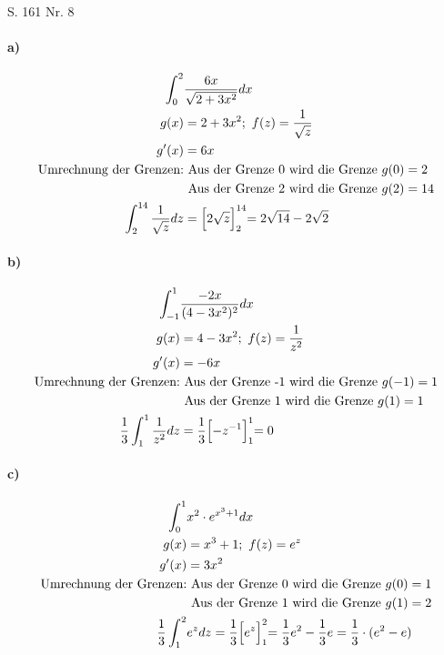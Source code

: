 \documentclass[12pt,a4paper]{report}
\begin{document}
	\noindent
	\Large S. 161 Nr. 8
	\large
	\paragraph{a)}
	\begin{align*}
		\int_{0}^{2} &\frac{6x}{\sqrt{2 + 3x^2}}dx \\
		g(x) &= 2 + 3x^2;\ f(z) = \frac{1}{\sqrt{z}} \\
		g'(x) &= 6x \\
		\text{Umrechnung der Grenzen:}&\ \text{Aus der Grenze 0 wird die Grenze}\  g(0) = 2 \\
		&\ \text{Aus der Grenze 2 wird die Grenze}\ g(2) = 14 \\
		\int_{2}^{14} \frac{1}{\sqrt{z}} dz &= \Bigl[2\sqrt{z}\Bigl]_{2}^{14} = 2\sqrt{14} - 2\sqrt{2}
	\end{align*}
	\paragraph{b)}
	\begin{align*}
		\int_{-1}^{1} &\frac{-2x}{(4-3x^2)^2} dx \\
		g(x) &= 4-3x^2;\ f(z) = \frac{1}{z^2} \\
		g'(x) &= -6x \\
		\text{Umrechnung der Grenzen:}&\ \text{Aus der Grenze -1 wird die Grenze}\ g(-1) = 1 \\
		&\ \text{Aus der Grenze 1 wird die Grenze}\ g(1) = 1 \\
		\frac{1}{3} \int_{1}^{1} \frac{1}{z^2} dz &= \frac{1}{3}\Bigl[-z^{-1}\Bigl]_{1}^{1} = 0
	\end{align*}
	\paragraph{c)}
	\begin{align*}
		\int_{0}^{1} &x^2\cdot e^{x^3+1} dx \\
		g(x) &= x^3 + 1;\ f(z) = e^z \\
		g'(x) &= 3x^2 \\
		\text{Umrechnung der Grenzen:}&\ \text{Aus der Grenze 0 wird die Grenze}\ g(0)=1 \\
		&\ \text{Aus der Grenze 1 wird die Grenze}\ g(1) = 2 \\
		\frac{1}{3}\int_{1}^{2}& e^z dz = \frac{1}{3}\Bigl[e^z\Bigl]_{1}^{2} = \frac{1}{3} e^2 - \frac{1}{3}e = \frac{1}{3}\cdot (e^2 - e)
	\end{align*}
\end{document}
